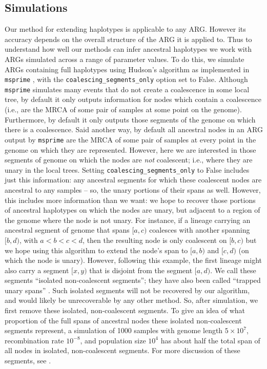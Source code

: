 \documentclass[10pt,twoside,lineno]{gsajnl}
\newcommand{\msprime}{\texttt{msprime}}
\begin{document}
\subsection{Simulations}

Our method for extending haplotypes is applicable to any ARG.
However its accuracy depends on the overall structure of the ARG it is applied to. 
Thus to understand how well our methods can infer ancestral haplotypes we 
work with ARGs simulated across a range of parameter values.
To do this, we simulate ARGs containing full haplotypes using 
Hudson's algorithm as implemented in \msprime{} 
\citep{kelleher2016efficient,baumdicker2021efficient},
with the \texttt{coalescing\_segments\_only} option set to False.
Although \msprime{} simulates many events that do not create a coalescence in some local tree,
by default it only outputs information for nodes which contain a coalescence
(i.e., are the MRCA of some pair of samples at some point on the genome).
Furthermore, by default it only outputs those segments of the genome
on which there is a coalescence.
Said another way, by default all ancestral nodes in an ARG
output by \msprime{} are the MRCA of some pair of samples at every point in the genome
on which they are represented.
However, here we are interested in those segments of genome
on which the nodes are \emph{not} coalescent;
i.e., where they are unary in the local trees.
Setting \texttt{coalescing\_segments\_only} to False includes just this information:
any ancestral segments for which these coalescent nodes
are ancestral to any samples -- so, the unary portions of their spans as well.
However, this includes more information than we want:
we hope to recover those portions of ancestral haplotypes
on which the nodes are unary, but adjacent to a region of the genome where the node is not unary.
For instance, if a lineage carrying an ancestral segment of genome that spans $[a, c)$
coalesces with another spanning $[b, d)$, with $a < b < c < d$,
then the resulting node is only coalescent on $[b, c)$ but we hope using this algorithm
to extend the node's span to $[a, b)$ and $[c, d)$
(on which the node is unary).
However, following this example, the first lineage might also carry a segment $[x, y)$
that is disjoint from the segment $[a, d)$.
We call these segments ``isolated non-coalescent segments'';
they have also been called ``trapped unary spans'' \citep[by][]{wong2024general}.
Such isolated segments will not be recovered by our algorithm,
and would likely be unrecoverable by any other method.
So, after simulation, we first remove these isolated, non-coalescent segments.
To give an idea of what proportion of the full spans of ancestral nodes
these isolated non-coalescent segments represent,
a simulation of 1000 samples
with genome length $5\times 10^7$, recombination rate $10^{-8}$, and population size $10^4$
has about half the total span of all nodes in isolated, non-coalescent segments.
For more discussion of these segments, see \citet{baumdicker2021efficient}.
\end{document}
